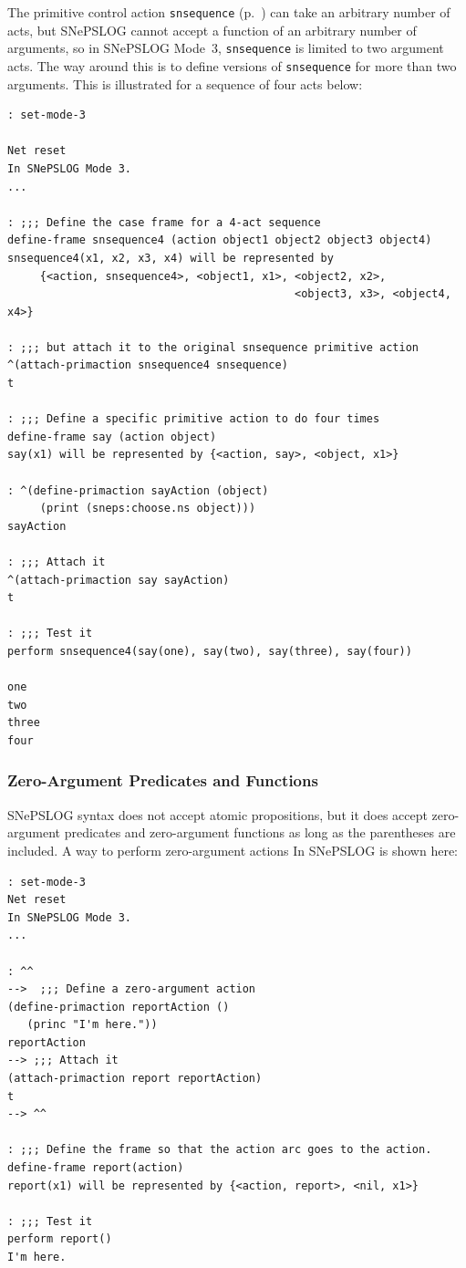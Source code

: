 \documentclass{book}
\begin{document}
The primitive control action \texttt{snsequence}
(p.~\pageref{snsequencedescr}) can take an arbitrary number of acts,
but SNePSLOG cannot accept a function of an arbitrary number of
arguments, so in SNePSLOG Mode~3, \texttt{snsequence} is limited to
two argument acts.  The way around this is to define versions of
\texttt{snsequence} for more than two arguments.  This is illustrated
for a sequence of four acts below:
\begin{verbatim}
: set-mode-3

Net reset
In SNePSLOG Mode 3.
...

: ;;; Define the case frame for a 4-act sequence
define-frame snsequence4 (action object1 object2 object3 object4)
snsequence4(x1, x2, x3, x4) will be represented by
     {<action, snsequence4>, <object1, x1>, <object2, x2>,
                                            <object3, x3>, <object4, x4>}

: ;;; but attach it to the original snsequence primitive action
^(attach-primaction snsequence4 snsequence)
t

: ;;; Define a specific primitive action to do four times
define-frame say (action object)
say(x1) will be represented by {<action, say>, <object, x1>}

: ^(define-primaction sayAction (object)
     (print (sneps:choose.ns object)))
sayAction

: ;;; Attach it
^(attach-primaction say sayAction)
t

: ;;; Test it
perform snsequence4(say(one), say(two), say(three), say(four))

one 
two 
three 
four 
\end{verbatim}

\subsubsection{Zero-Argument Predicates and Functions}
SNePSLOG syntax does not accept atomic propositions, but it does
accept zero-argument predicates and zero-argument functions as long
as the parentheses are included.  A way to perform zero-argument
actions In SNePSLOG is shown here:
\begin{verbatim}
: set-mode-3
Net reset
In SNePSLOG Mode 3.
...

: ^^
-->  ;;; Define a zero-argument action
(define-primaction reportAction ()
   (princ "I'm here."))
reportAction
--> ;;; Attach it
(attach-primaction report reportAction)
t
--> ^^

: ;;; Define the frame so that the action arc goes to the action.
define-frame report(action)
report(x1) will be represented by {<action, report>, <nil, x1>}

: ;;; Test it
perform report()
I'm here.
\end{verbatim}
\end{document}
